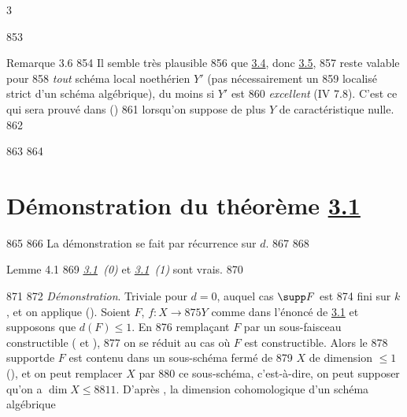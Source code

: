 3	\documentclass[10pt]{../fichiers-configuration-latex/smfart}
\begin{document}
   853	\begin{enonce*}[remark]{Remarque 3.6}
   854	Il semble très plausible 
   856	que \hyperref[XIV.cor3.4]{3.4}, donc \hyperref[XIV.cor3.5]{3.5}, 
   857	reste valable pour
   858	\emph{tout} schéma local noethérien $Y'$ (pas nécessairement un
   859	localisé strict d'un schéma algébrique), du moins si $Y'$ est
   860	\emph{excellent} (\EGA IV 7.8). C'est ce qui sera prouvé dans ()
   861	lorsqu'on suppose de plus $Y$ de caractéristique nulle.
   862	\end{enonce*}
   863	
   864	\section{Démonstration du théorème \hyperref[XIV.thm3.1]{3.1}}
   865	
   866	La démonstration se fait par récurrence sur $d$.
   867	
   868	\begin{enonce*}{Lemme 4.1}
   869	\emph{\hyperref[XIV.thm3.1]{3.1}~(0)} et \emph{\hyperref[XIV.thm3.1]{3.1}~(1)} sont vrais.
   870	\end{enonce*}
   871	
   872		\emph{Démonstration}. Triviale pour $d=0$, auquel cas $\supp F$ est
   874	fini sur $k$, et on applique (). Soient $F$, $f:X\rightarrow
   875	Y$ comme dans l'énoncé de \hyperref[XIV.thm3.1]{3.1} et supposons que $d(F)\leq 1$. En
   876	remplaçant $F$ par un sous-faisceau constructible ( et ), 
   877	on se réduit au cas où $F$ est constructible. Alors le
   878	support\pageoriginale de $F$ est contenu dans un sous-schéma fermé de
   879	$X$ de dimension $\leq 1$ (), et on peut remplacer $X$ par
   880	ce sous-schéma, c'est-à-dire, on peut supposer qu'on a $\dim X\leq
   881	1$. D'après , la dimension cohomologique d'un schéma algébrique
\end{document}

